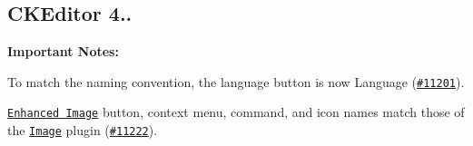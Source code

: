 \subsection*{C\-K\-Editor 4..}

{\bfseries Important Notes\-:}
\begin{DoxyItemize}
\item To match the naming convention, the {\ttfamily language} button is now {\ttfamily Language} (\href{http://dev.ckeditor.com/ticket/11201}{\tt \#11201}).
\item \href{http://ckeditor.com/addon/image2}{\tt Enhanced Image} button, context menu, command, and icon names match those of the \href{http://ckeditor.com/addon/image}{\tt Image} plugin (\href{http://dev.ckeditor.com/ticket/11222}{\tt \#11222}).
\end{DoxyItemize}

